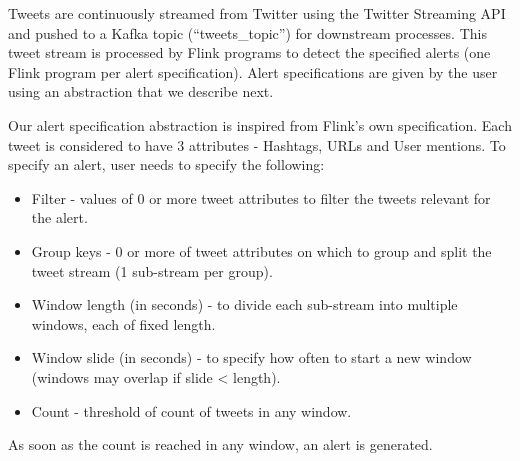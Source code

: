 \documentclass[letterpaper,10pt,english]{sphinxmanual}
\begin{document}
Tweets are continuously streamed from Twitter using the Twitter Streaming API and pushed to a Kafka topic (“tweets\_topic”) for downstream processes. This tweet stream is processed by Flink programs to detect the specified alerts (one Flink program per alert specification). Alert specifications are given by the user using an abstraction that we describe next.

Our alert specification abstraction is inspired from Flink’s own specification. Each tweet is considered to have 3 attributes - Hashtags, URLs and User mentions. To specify an alert, user needs to specify the following:
\begin{itemize}
\item {} 
Filter - values of 0 or more tweet attributes to filter the tweets relevant for the alert.

\item {} 
Group keys - 0 or more of tweet attributes on which to group and split the tweet stream (1 sub-stream per group).

\item {} 
Window length (in seconds) - to divide each sub-stream into multiple windows, each of fixed length.

\item {} 
Window slide (in seconds) - to specify how often to start a new window (windows may overlap if slide \textless{} length).

\item {} 
Count - threshold of count of tweets in any window.

\end{itemize}

As soon as the count is reached in any window, an alert is generated.
\end{document}
